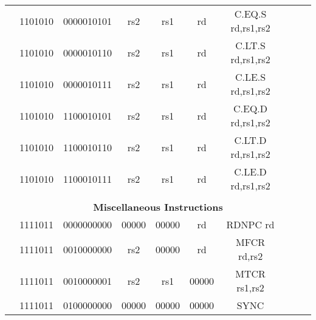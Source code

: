 \begin{table}[p]
\begin{small}
\begin{center}
\begin{tabular}{rcccccccccccl}
&
\multicolumn{1}{|c|}{1101010} &
\multicolumn{4}{c|}{0000010101} &
\multicolumn{1}{c|}{rs2} &
\multicolumn{1}{c|}{rs1} &
\multicolumn{1}{c|}{rd} & C.EQ.S rd,rs1,rs2 \\
\cline{2-9}
  

&
\multicolumn{1}{|c|}{1101010} &
\multicolumn{4}{c|}{0000010110} &
\multicolumn{1}{c|}{rs2} &
\multicolumn{1}{c|}{rs1} &
\multicolumn{1}{c|}{rd} & C.LT.S rd,rs1,rs2 \\
\cline{2-9}
  

&
\multicolumn{1}{|c|}{1101010} &
\multicolumn{4}{c|}{0000010111} &
\multicolumn{1}{c|}{rs2} &
\multicolumn{1}{c|}{rs1} &
\multicolumn{1}{c|}{rd} & C.LE.S rd,rs1,rs2 \\
\cline{2-9}
  

&
\multicolumn{1}{|c|}{1101010} &
\multicolumn{4}{c|}{1100010101} &
\multicolumn{1}{c|}{rs2} &
\multicolumn{1}{c|}{rs1} &
\multicolumn{1}{c|}{rd} & C.EQ.D rd,rs1,rs2 \\
\cline{2-9}
  

&
\multicolumn{1}{|c|}{1101010} &
\multicolumn{4}{c|}{1100010110} &
\multicolumn{1}{c|}{rs2} &
\multicolumn{1}{c|}{rs1} &
\multicolumn{1}{c|}{rd} & C.LT.D rd,rs1,rs2 \\
\cline{2-9}
  

&
\multicolumn{1}{|c|}{1101010} &
\multicolumn{4}{c|}{1100010111} &
\multicolumn{1}{c|}{rs2} &
\multicolumn{1}{c|}{rs1} &
\multicolumn{1}{c|}{rd} & C.LE.D rd,rs1,rs2 \\
\cline{2-9}
  

&
\multicolumn{11}{c}{} & \\
&
\multicolumn{11}{c}{\bf Miscellaneous Instructions} & \\
\cline{2-9}
  

&
\multicolumn{1}{|c|}{1111011} &
\multicolumn{4}{c|}{0000000000} &
\multicolumn{1}{c|}{00000} &
\multicolumn{1}{c|}{00000} &
\multicolumn{1}{c|}{rd} & RDNPC rd \\
\cline{2-9}
  

&
\multicolumn{1}{|c|}{1111011} &
\multicolumn{4}{c|}{0010000000} &
\multicolumn{1}{c|}{rs2} &
\multicolumn{1}{c|}{00000} &
\multicolumn{1}{c|}{rd} & MFCR rd,rs2 \\
\cline{2-9}
  

&
\multicolumn{1}{|c|}{1111011} &
\multicolumn{4}{c|}{0010000001} &
\multicolumn{1}{c|}{rs2} &
\multicolumn{1}{c|}{rs1} &
\multicolumn{1}{c|}{00000} & MTCR rs1,rs2 \\
\cline{2-9}
  

&
\multicolumn{1}{|c|}{1111011} &
\multicolumn{4}{c|}{0100000000} &
\multicolumn{1}{c|}{00000} &
\multicolumn{1}{c|}{00000} &
\multicolumn{1}{c|}{00000} & SYNC  \\
\cline{2-9}
  


\end{tabular}
\end{center}
\end{small}
\end{table}
